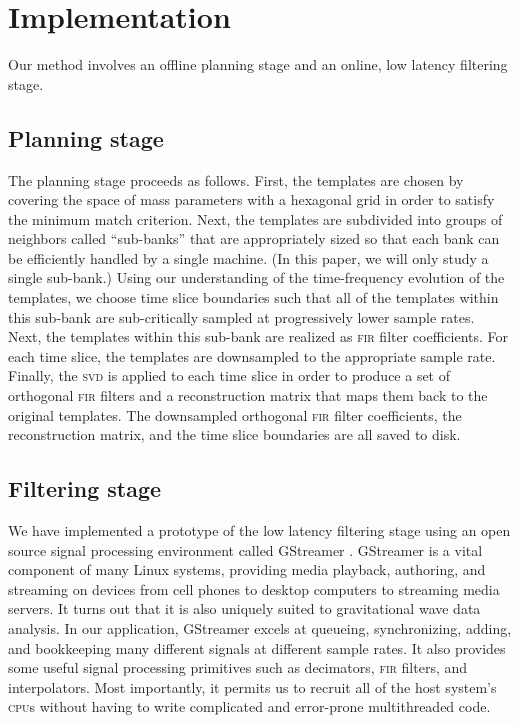 \section{Implementation}

Our method involves an offline planning stage and an online, low latency filtering stage.

\subsection{Planning stage}

The planning stage proceeds as follows.  First, the templates are chosen by covering the space of mass parameters with a hexagonal grid \cite{PhysRevD.76.102004} in order to satisfy the minimum match criterion.  Next, the templates are subdivided into groups of neighbors called ``sub-banks'' that are appropriately sized so that each bank can be efficiently handled by a single machine.  (In this paper, we will only study a single sub-bank.)  Using our understanding of the time-frequency evolution of the templates, we choose time slice boundaries such that all of the templates within this sub-bank are sub-critically sampled at progressively lower sample rates.  Next, the templates within this sub-bank are realized as \textsc{fir} filter coefficients.  For each time slice, the templates are downsampled to the appropriate sample rate.  Finally, the \textsc{svd} is applied to each time slice in order to produce a set of orthogonal \textsc{fir} filters and a reconstruction matrix that maps them back to the original templates.  The downsampled orthogonal \textsc{fir} filter coefficients, the reconstruction matrix, and the time slice boundaries are all saved to disk.

\subsection{Filtering stage}

We have implemented a prototype of the low latency filtering stage using an open source signal processing environment called GStreamer \cite{gstreamer}.  GStreamer is a vital component of many Linux systems, providing media playback, authoring, and streaming on devices from cell phones to desktop computers to streaming media servers.  It turns out that it is also uniquely suited to gravitational wave data analysis.  In our application, GStreamer excels at queueing, synchronizing, adding, and bookkeeping many different signals at different sample rates.  It also provides some useful signal processing primitives such as decimators, \textsc{fir} filters, and interpolators.  Most importantly, it permits us to recruit all of the host system's \textsc{cpu}s without having to write complicated and error-prone multithreaded code.


